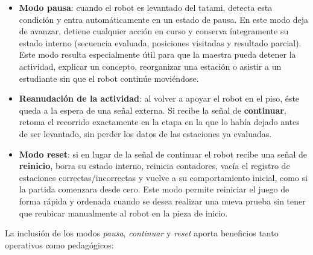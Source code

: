 \documentclass{prgrado}
\begin{document}
\begin{itemize}
    \item \textbf{Modo pausa}: cuando el robot es levantado del tatami, detecta esta condición y entra automáticamente en un estado de pausa. En este modo deja de avanzar, detiene cualquier acción en curso y conserva íntegramente su estado interno (secuencia evaluada, posiciones visitadas y resultado parcial). Este modo resulta especialmente útil para que la maestra pueda detener la actividad, explicar un concepto, reorganizar una estación o asistir a un estudiante sin que el robot continúe moviéndose.
    
    \item \textbf{Reanudación de la actividad}: al volver a apoyar el robot en el piso, éste queda a la espera de una señal externa. Si recibe la señal de \textbf{continuar}, retoma el recorrido exactamente en la etapa en la que lo había dejado antes de ser levantado, sin perder los datos de las estaciones ya evaluadas.
    
    \item \textbf{Modo reset}: si en lugar de la señal de continuar el robot recibe una señal de \textbf{reinicio}, borra su estado interno, reinicia contadores, vacía el registro de estaciones correctas/incorrectas y vuelve a su comportamiento inicial, como si la partida comenzara desde cero. Este modo permite reiniciar el juego de forma rápida y ordenada cuando se desea realizar una nueva prueba sin tener que reubicar manualmente al robot en la pieza de inicio.
\end{itemize}


La inclusión de los modos \emph{pausa}, \emph{continuar} y \emph{reset} aporta beneficios tanto operativos como pedagógicos:
\end{document}
